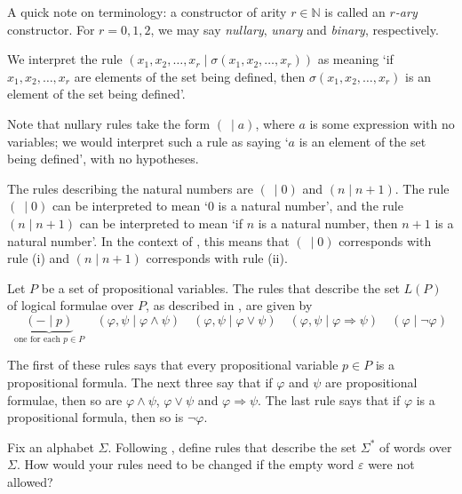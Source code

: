 A quick note on terminology: a constructor of arity $r \in \mathbb{N}$ is called an \textit{$r$-ary} constructor. For $r=0,1,2$, we may say \textit{nullary}, \textit{unary} and \textit{binary}, respectively.

We interpret the rule $(x_1,x_2,\dots,x_r \mid \sigma(x_1,x_2,\dots,x_r))$ as meaning `if $x_1,x_2,\dots,x_r$ are elements of the set being defined, then $\sigma(x_1,x_2,\dots,x_r)$ is an element of the set being defined'.

Note that nullary rules take the form $(~ \mid a)$, where $a$ is some expression with no variables; we would interpret such a rule as saying `$a$ is an element of the set being defined', with no hypotheses.

\begin{example}
The rules describing the natural numbers are $(~ \mid 0)$ and $(n \mid n+1)$. The rule $(~ \mid 0)$ can be interpreted to mean `$0$ is a natural number', and the rule $(n \mid n+1)$ can be interpreted to mean `if $n$ is a natural number, then $n+1$ is a natural number'. In the context of , this means that $(~ \mid 0)$ corresponds with rule (i) and $(n \mid n+1)$ corresponds with rule (ii).
\end{example}

\begin{example}
\label{exRulesForInductiveDefinitionOfPropositionalFormulae}
Let $P$ be a set of propositional variables. The rules that describe the set $L(P)$ of logical formulae over $P$, as described in , are given by
\[ \underbrace{({-} \mid p)}_{\text{one for each } p \in P} \quad (\varphi,\psi \mid \varphi \wedge \psi) \quad (\varphi,\psi \mid \varphi \vee \psi) \quad (\varphi,\psi \mid \varphi \Rightarrow \psi) \quad (\varphi \mid \neg \varphi) \]

The first of these rules says that every propositional variable $p \in P$ is a propositional formula. The next three say that if $\varphi$ and $\psi$ are propositional formulae, then so are $\varphi \wedge \psi$, $\varphi \vee \psi$ and $\varphi \Rightarrow \psi$. The last rule says that if $\varphi$ is a propositional formula, then so is $\neg \varphi$.
\end{example}

\begin{exercise}
\label{exRulesForInductiveDefinitionOfWords}
Fix an alphabet $\Sigma$. Following , define rules that describe the set $\Sigma^*$ of words over $\Sigma$. How would your rules need to be changed if the empty word $\varepsilon$ were not allowed?
\end{exercise}

